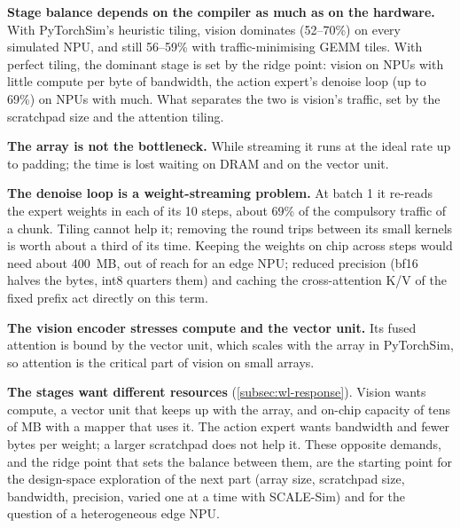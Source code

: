 \begin{dashlist}
  \item \textbf{Stage balance depends on the compiler as much as on the hardware.} With PyTorchSim's heuristic tiling, vision dominates (52--70\%) on every simulated NPU, and still 56--59\% with traffic-minimising GEMM tiles. With perfect tiling, the dominant stage is set by the ridge point: vision on NPUs with little compute per byte of bandwidth, the action expert's denoise loop (up to 69\%) on NPUs with much. What separates the two is vision's traffic, set by the scratchpad size and the attention tiling.
  \item \textbf{The array is not the bottleneck.} While streaming it runs at the ideal rate up to padding; the time is lost waiting on DRAM and on the vector unit.
  \item \textbf{The denoise loop is a weight-streaming problem.} At batch 1 it re-reads the expert weights in each of its 10 steps, about 69\% of the compulsory traffic of a chunk. Tiling cannot help it; removing the round trips between its small kernels is worth about a third of its time. Keeping the weights on chip across steps would need about 400~MB, out of reach for an edge NPU; reduced precision (bf16 halves the bytes, int8 quarters them) and caching the cross-attention K/V of the fixed prefix act directly on this term.
  \item \textbf{The vision encoder stresses compute and the vector unit.} Its fused attention is bound by the vector unit, which scales with the array in PyTorchSim, so attention is the critical part of vision on small arrays.
  \item \textbf{The stages want different resources} (\cref{subsec:wl-response}). Vision wants compute, a vector unit that keeps up with the array, and on-chip capacity of tens of MB with a mapper that uses it. The action expert wants bandwidth and fewer bytes per weight; a larger scratchpad does not help it. These opposite demands, and the ridge point that sets the balance between them, are the starting point for the design-space exploration of the next part (array size, scratchpad size, bandwidth, precision, varied one at a time with SCALE-Sim) and for the question of a heterogeneous edge NPU.
\end{dashlist}
